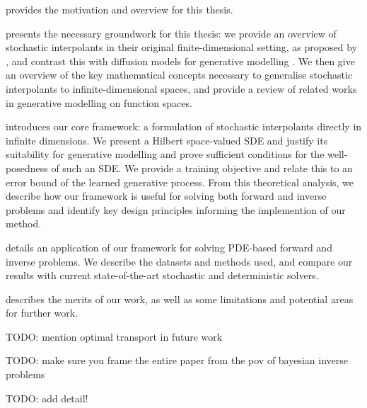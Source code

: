 \textbf{} provides the motivation and overview for this thesis.

\textbf{} presents the necessary groundwork for this thesis: we provide an overview of stochastic interpolants in their original finite-dimensional setting, as proposed by \citet{albergo2023stochasticinterpolantsunifyingframework}, and contrast this with diffusion models for generative modelling \citep{song2021scorebasedgenerativemodelingstochastic}. We then give an overview of the key mathematical concepts necessary to generalise stochastic interpolants to infinite-dimensional spaces, and provide a review of related works in generative modelling on function spaces.

\textbf{} introduces our core framework: a formulation of stochastic interpolants directly in infinite dimensions. We present a Hilbert space-valued SDE and justify its suitability for generative modelling and prove sufficient conditions for the well-posedness of such an SDE. We provide a training objective and relate this to an error bound of the learned generative process. From this theoretical analysis, we describe how our framework is useful for solving both forward and inverse problems and identify key design principles informing the implemention of our method.

\textbf{} details an application of our framework for solving PDE-based forward and inverse problems. We describe the datasets and methods used, and compare our results with current state-of-the-art stochastic and deterministic solvers. %

\textbf{} describes the merits of our work, as well as some limitations and potential areas for further work.

TODO: mention optimal transport in future work

TODO: make sure you frame the entire paper from the pov of bayesian inverse problems

TODO: add detail!




